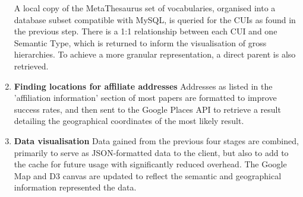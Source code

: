 \documentclass[Report.tex]{subfiles}
\begin{document}
\begin{enumerate}
\newline A local copy of the MetaThesaurus set of vocabularies, organised into a database subset compatible with MySQL, is queried for the CUIs as found in the previous step. There is a 1:1 relationship between each CUI and one Semantic Type, which is returned to inform the visualisation of gross hierarchies. To achieve a more granular representation, a direct parent is also retrieved.
\item{\textbf{Finding locations for affiliate addresses}}
\newline Addresses as listed in the 'affiliation information' section of most papers are formatted to improve success rates, and then sent to the Google Places API to retrieve a result detailing the geographical coordinates of the most likely result.
\item{\textbf{Data visualisation}}
\newline Data gained from the previous four stages are combined, primarily to serve as JSON-formatted data to the client, but also to add to the cache for future usage with significantly reduced overhead. The Google Map and D3 canvas are updated to reflect the semantic and geographical information represented the data.
\end{enumerate}
\end{document}
